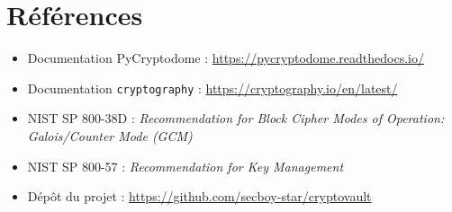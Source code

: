 \documentclass[11pt,a4paper]{article}
\newcommand{\depot}{https://github.com/secboy-star/cryptovault}
\begin{document}
\section*{R\'ef\'erences}
\begin{itemize}
  \item Documentation PyCryptodome : \url{https://pycryptodome.readthedocs.io/}
  \item Documentation \texttt{cryptography} : \url{https://cryptography.io/en/latest/}
  \item NIST SP 800-38D : \emph{Recommendation for Block Cipher Modes of Operation: Galois/Counter Mode (GCM)}
  \item NIST SP 800-57 : \emph{Recommendation for Key Management}
  \item D\'ep\^ot du projet : \url{\depot}
\end{itemize}
\end{document}

